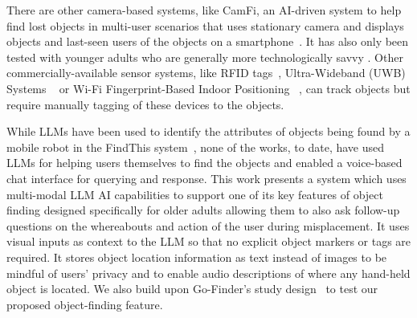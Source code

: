 There are other camera-based systems, like CamFi, an AI-driven system to help find lost objects in multi-user scenarios that uses stationary camera and displays objects and last-seen users of the objects on a smartphone~\cite{yan2022camfi}. It has also only been tested with younger adults who are generally more technologically savvy \cite{olson2011diffusion}. 
Other commercially-available sensor systems, like RFID tags~\cite{lin2005object,abowd2002aware}, Ultra-Wideband (UWB) Systems ~\cite{fontana2002ultra} or Wi-Fi Fingerprint-Based Indoor Positioning ~\cite{he2015wi, nabati2023real}, can track objects but require manually tagging of these devices to the objects.


While LLMs have been used to identify the attributes of objects being found by a mobile robot in the FindThis system~\cite{majumdar2023findthis}, none of the works, to date, have used LLMs for helping users themselves to find the objects and enabled a voice-based chat interface for querying and response. This work presents a system which uses multi-modal LLM AI capabilities to support one of its key features of object finding designed specifically for older adults allowing them to also ask follow-up questions on the whereabouts and action of the user during misplacement. It uses visual inputs as context to the LLM so that no explicit object markers or tags are required. It stores object location information as text instead of images to be mindful of users' privacy and to enable audio descriptions of where any hand-held object is located. We also build upon Go-Finder's study design~\cite{gofinder} to test our proposed object-finding feature.






